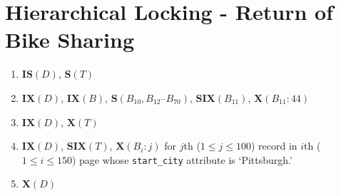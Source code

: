 \documentclass{homework}
\begin{document}
\section{Hierarchical Locking - Return of Bike Sharing}

\begin{enumerate}
    \item $\mathbf{IS}(D)$, $\mathbf{S}(T)$
    \item $\mathbf{IX}(D)$, $\mathbf{IX}(B)$, $\mathbf{S}(B_{10}, B_{12}\textrm{--}B_{70})$, $\mathbf{SIX}(B_{11})$, $\mathbf{X}(B_{11}:44)$
    \item $\mathbf{IX}(D)$, $\mathbf{X}(T)$
    \item $\mathbf{IX}(D)$, $\mathbf{SIX}(T)$, $\mathbf{X}(B_i: j)$ for $j$th ($1 \le j \le 100$) record in $i$th ($1 \le i \le 150$) page whose \texttt{start\_city} attribute is `Pittsburgh.'
    \item $\mathbf{X}(D)$
\end{enumerate}
\end{document}
